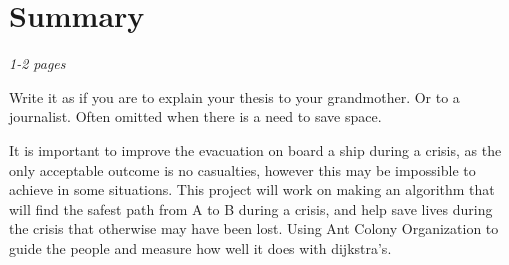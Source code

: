 \chapter{Summary}
\label{ch:summary}
\textit{1-2 pages}

Write it as if you are to explain your thesis to your grandmother.
Or to a journalist.
Often omitted when there is a need to save space.

It is important to improve the evacuation on board a ship during a crisis, as the only acceptable outcome is no casualties, however this may be impossible to achieve in some situations. This project will work on making an algorithm that will find the safest path from A to B during a crisis, and help save lives during the crisis that otherwise may have been lost. Using Ant Colony Organization to guide the people and measure how well it does with dijkstra's.